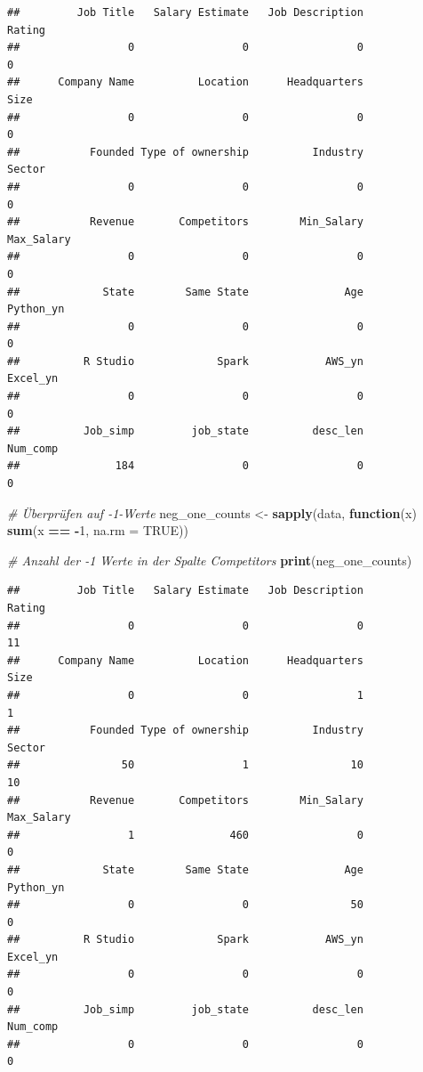 \documentclass[
]{article}
\newenvironment{Shaded}{\begin{snugshade}}{\end{snugshade}}
\newcommand{\AttributeTok}[1]{\textcolor[rgb]{0.13,0.29,0.53}{#1}}
\newcommand{\CommentTok}[1]{\textcolor[rgb]{0.56,0.35,0.01}{\textit{#1}}}
\newcommand{\ConstantTok}[1]{\textcolor[rgb]{0.56,0.35,0.01}{#1}}
\newcommand{\ControlFlowTok}[1]{\textcolor[rgb]{0.13,0.29,0.53}{\textbf{#1}}}
\newcommand{\DecValTok}[1]{\textcolor[rgb]{0.00,0.00,0.81}{#1}}
\newcommand{\FunctionTok}[1]{\textcolor[rgb]{0.13,0.29,0.53}{\textbf{#1}}}
\newcommand{\NormalTok}[1]{#1}
\newcommand{\OtherTok}[1]{\textcolor[rgb]{0.56,0.35,0.01}{#1}}
\newcommand{\SpecialCharTok}[1]{\textcolor[rgb]{0.81,0.36,0.00}{\textbf{#1}}}
\begin{document}
\begin{verbatim}
##         Job Title   Salary Estimate   Job Description            Rating 
##                 0                 0                 0                 0 
##      Company Name          Location      Headquarters              Size 
##                 0                 0                 0                 0 
##           Founded Type of ownership          Industry            Sector 
##                 0                 0                 0                 0 
##           Revenue       Competitors        Min_Salary        Max_Salary 
##                 0                 0                 0                 0 
##             State        Same State               Age         Python_yn 
##                 0                 0                 0                 0 
##          R Studio             Spark            AWS_yn          Excel_yn 
##                 0                 0                 0                 0 
##          Job_simp         job_state          desc_len          Num_comp 
##               184                 0                 0                 0
\end{verbatim}

\begin{Shaded}
\begin{Highlighting}[]
\CommentTok{\# Überprüfen auf {-}1{-}Werte}
\NormalTok{neg\_one\_counts }\OtherTok{\textless{}{-}} \FunctionTok{sapply}\NormalTok{(data, }\ControlFlowTok{function}\NormalTok{(x) }\FunctionTok{sum}\NormalTok{(x }\SpecialCharTok{==} \SpecialCharTok{{-}}\DecValTok{1}\NormalTok{, }\AttributeTok{na.rm =} \ConstantTok{TRUE}\NormalTok{))}

\CommentTok{\# Anzahl der {-}1 Werte in der Spalte Competitors}
\FunctionTok{print}\NormalTok{(neg\_one\_counts)}
\end{Highlighting}
\end{Shaded}

\begin{verbatim}
##         Job Title   Salary Estimate   Job Description            Rating 
##                 0                 0                 0                11 
##      Company Name          Location      Headquarters              Size 
##                 0                 0                 1                 1 
##           Founded Type of ownership          Industry            Sector 
##                50                 1                10                10 
##           Revenue       Competitors        Min_Salary        Max_Salary 
##                 1               460                 0                 0 
##             State        Same State               Age         Python_yn 
##                 0                 0                50                 0 
##          R Studio             Spark            AWS_yn          Excel_yn 
##                 0                 0                 0                 0 
##          Job_simp         job_state          desc_len          Num_comp 
##                 0                 0                 0                 0
\end{verbatim}
\end{document}
